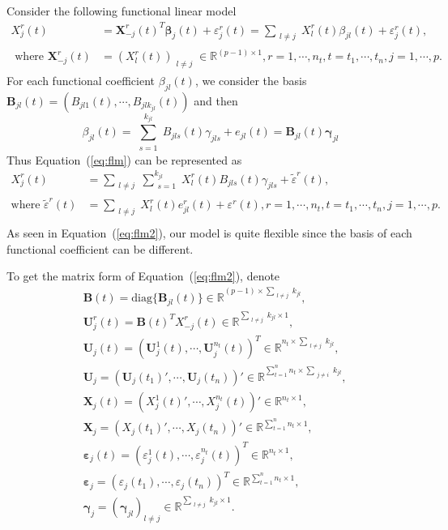 \documentclass[11pt]{article}
\newcommand{\R}{\mathbb R}
\newcommand{\bX}{\mathbf X}
\newcommand{\bB}{\mathbf B}
\newcommand{\bU}{\mathbf U}
\newcommand{\bbeta}{{\boldsymbol{\beta}}}
\newcommand{\bvarepsilon}{\boldsymbol{\varepsilon}}
\newcommand{\bgamma}{\boldsymbol{\gamma}}
\begin{document}
Consider the following functional linear model
\begin{equation} 
	\label{eq:flm}
    \begin{aligned}
    X_j^r(t) &= {\bX_{-j}^r(t)}^T \bbeta_j(t) + \varepsilon_j^r(t) = \sum_{\substack{l\neq j}} X_l^r(t) \beta_{jl}(t) + \varepsilon_j^r(t),\\
    \text{ where }\bX_{-j}^r(t) &= (X_l^r(t))_{\substack{l \neq j}} \in \R^{(p-1) \times 1}, r = 1, \cdots, n_t, t = t_1, \cdots, t_n, j = 1, \cdots, p.
    \end{aligned}
\end{equation}
For each functional coefficient $\beta_{jl}(t)$, we consider the basis $\bB_{jl}(t) = (B_{jl1}(t), \cdots, B_{jlk_{jl}}(t) )$ and then 
$$\beta_{jl}(t) = \sum_{\substack{s=1}}^{k_{jl}} B_{jls}(t) \gamma_{jls} + e_{jl}(t) = \bB_{jl}(t) \bgamma_{jl} $$
Thus Equation~(\ref{eq:flm}) can be represented as
\begin{equation}
	\label{eq:flm2}
	\begin{aligned}
	X_j^r(t) &= \sum_{\substack{l \neq j}} \sum_{\substack{s=1}}^{k_{jl}} X_l^r(t) B_{jls}(t) \gamma_{jls} + \tilde{\varepsilon}^r(t), \\
	\text{where } \tilde{\varepsilon}^r(t) &= \sum_{\substack{l \neq j}} X_l^r(t)e_{jl}^r(t) + \varepsilon^r(t), r = 1, \cdots, n_t, t = t_1, \cdots, t_n, j = 1, \cdots, p.\\
	\end{aligned}
\end{equation}
As seen in Equation~(\ref{eq:flm2}), our model is quite flexible since the basis of each functional coefficient can be different.

To get the matrix form of Equation~(\ref{eq:flm2}), denote 
\begin{align*}
	&\bB(t) = \text{diag}\{\bB_{jl}(t)\} \in \R^{(p-1)\times \sum_{\substack{l \neq j}}k_{jl} },\\
	&\bU_j^r(t) = \bB(t)^T X_{-j}^r(t) \in \R^{ \sum_{\substack{l \neq j}}k_{jl} \times 1},\\
	&\bU_j(t) = ( \bU_j^1(t), \cdots, \bU_j^{n_t}(t) )^T \in \R^{n_t \times \sum_{\substack{l \neq j}}k_{jl}},\\
	&\bU_j = ( \bU_j(t_1)', \cdots, \bU_j(t_n) )' \in \R^{\sum_{t = 1}^{n}n_t \times \sum_{\substack{j \neq i}}k_{jl}},\\
	&\bX_j(t) = (X_j^1(t)', \cdots, X_j^{n_t}(t))' \in \R^{n_t \times 1},\\
	&\bX_j = (X_j(t_1)', \cdots, X_j(t_n))' \in \R^{\sum_{t = 1}^{n}n_t \times 1},\\
	&\bvarepsilon_j(t) = (\varepsilon_j^1(t), \cdots, \varepsilon_j^{n_t}(t))^T \in \R^{n_t \times 1},\\
	&\bvarepsilon_j = (\varepsilon_j(t_1), \cdots, \varepsilon_j(t_n))^T \in \R^{\sum_{t = 1}^{n}n_t \times 1},\\
	&\bgamma_j = (\bgamma_{jl})_{l \neq j} \in \R^{\sum_{\substack{l \neq j}}k_{jl} \times 1}.
\end{align*}
\end{document}
